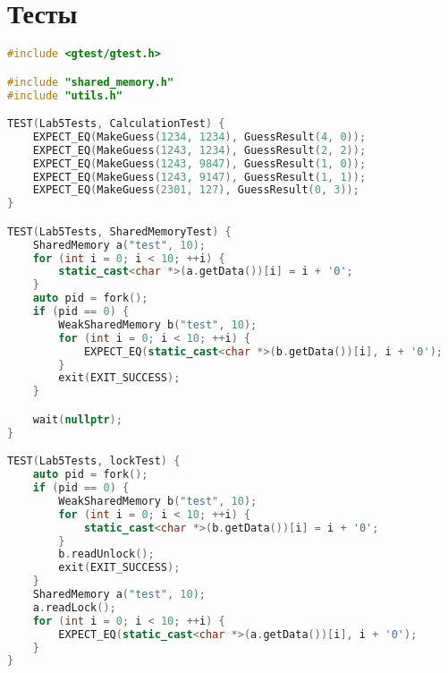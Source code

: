 \documentclass[a4paper, 12pt]{article}
\begin{document}
\newpage
\section{Тесты}

\begin{lstlisting}[language=C++]
#include <gtest/gtest.h>

#include "shared_memory.h"
#include "utils.h"

TEST(Lab5Tests, CalculationTest) {
    EXPECT_EQ(MakeGuess(1234, 1234), GuessResult(4, 0));
    EXPECT_EQ(MakeGuess(1243, 1234), GuessResult(2, 2));
    EXPECT_EQ(MakeGuess(1243, 9847), GuessResult(1, 0));
    EXPECT_EQ(MakeGuess(1243, 9147), GuessResult(1, 1));
    EXPECT_EQ(MakeGuess(2301, 127), GuessResult(0, 3));
}

TEST(Lab5Tests, SharedMemoryTest) {
    SharedMemory a("test", 10);
    for (int i = 0; i < 10; ++i) {
        static_cast<char *>(a.getData())[i] = i + '0';
    }
    auto pid = fork();
    if (pid == 0) {
        WeakSharedMemory b("test", 10);
        for (int i = 0; i < 10; ++i) {
            EXPECT_EQ(static_cast<char *>(b.getData())[i], i + '0');
        }
        exit(EXIT_SUCCESS);
    }

    wait(nullptr);
}

TEST(Lab5Tests, lockTest) {
    auto pid = fork();
    if (pid == 0) {
        WeakSharedMemory b("test", 10);
        for (int i = 0; i < 10; ++i) {
            static_cast<char *>(b.getData())[i] = i + '0';
        }
        b.readUnlock();
        exit(EXIT_SUCCESS);
    }
    SharedMemory a("test", 10);
    a.readLock();
    for (int i = 0; i < 10; ++i) {
        EXPECT_EQ(static_cast<char *>(a.getData())[i], i + '0');
    }
}
\end{lstlisting}
\end{document}
